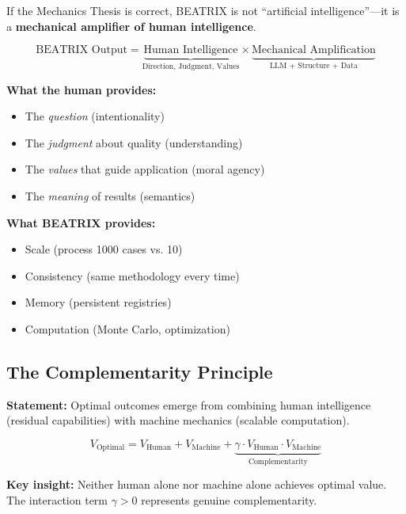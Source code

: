 If the Mechanics Thesis is correct, BEATRIX is not ``artificial intelligence''---it is a \textbf{mechanical amplifier of human intelligence}.

\begin{equation}
\text{BEATRIX Output} = \underbrace{\text{Human Intelligence}}_{\text{Direction, Judgment, Values}} \times \underbrace{\text{Mechanical Amplification}}_{\text{LLM + Structure + Data}}
\end{equation}

\textbf{What the human provides:}
\begin{itemize}[nosep]
    \item The \textit{question} (intentionality)
    \item The \textit{judgment} about quality (understanding)
    \item The \textit{values} that guide application (moral agency)
    \item The \textit{meaning} of results (semantics)
\end{itemize}

\textbf{What BEATRIX provides:}
\begin{itemize}[nosep]
    \item Scale (process 1000 cases vs. 10)
    \item Consistency (same methodology every time)
    \item Memory (persistent registries)
    \item Computation (Monte Carlo, optimization)
\end{itemize}


\subsection{The Complementarity Principle}

\begin{tcolorbox}[colback=green!5!white, colframe=green!75!black,
    title=The Human-Machine Complementarity Principle]
\textbf{Statement:} Optimal outcomes emerge from combining human intelligence (residual capabilities) with machine mechanics (scalable computation).

\begin{equation}
V_{\text{Optimal}} = V_{\text{Human}} + V_{\text{Machine}} + \underbrace{\gamma \cdot V_{\text{Human}} \cdot V_{\text{Machine}}}_{\text{Complementarity}}
\end{equation}

\textbf{Key insight:} Neither human alone nor machine alone achieves optimal value. The interaction term $\gamma > 0$ represents genuine complementarity.
\end{tcolorbox}


